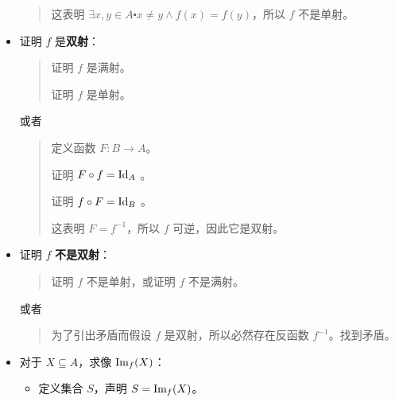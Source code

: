 \begin{itemize}
\begin{quote}
              这表明 $\exists x, y \in A \centerdot x \ne y \land f(x) = f(y)$，所以 $f$ 不是单射。
          \end{quote}
    \item 证明 $f$ 是\textbf{双射}：
          \begin{quote}
              证明 $f$ 是满射。

              证明 $f$ 是单射。
          \end{quote}
          或者
          \begin{quote}
              定义函数 $F:B \to A$。

              证明 $F \circ f = \text{Id}_A$ 。

              证明 $f \circ F = \text{Id}_B$ 。

              这表明 $F = f^{-1}$，所以 $f$ 可逆，因此它是双射。
          \end{quote}
    \item 证明 $f$ \textbf{不是双射}：
          \begin{quote}
              证明 $f$ 不是单射，或证明 $f$ 不是满射。
          \end{quote}
          或者
          \begin{quote}
              为了引出矛盾而假设 $f$ 是双射，所以必然存在反函数 $f^{-1}$。找到矛盾。
          \end{quote}
    \item 对于 $X \subseteq A$，求像 $\text{Im}_f (X)$：
          \begin{itemize}
              \item 定义集合 $S$，声明 $S = \text{Im}_f(X)$。


\end{itemize}
\end{itemize}
